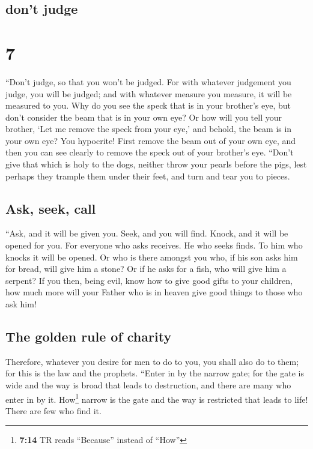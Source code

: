 \hypertarget{dont-judge}{%
\subsection{don't judge}\label{dont-judge}}

\hypertarget{section-6}{%
\section{7}\label{section-6}}

 ``Don't judge, so that you won't be judged.
 For with whatever judgement you judge, you will be
judged; and with whatever measure you measure, it will be measured to
you.  Why do you see the speck that is in your brother's
eye, but don't consider the beam that is in your own eye? 
Or how will you tell your brother, `Let me remove the speck from your
eye,' and behold, the beam is in your own eye?  You
hypocrite! First remove the beam out of your own eye, and then you can
see clearly to remove the speck out of your brother's eye.
 ``Don't give that which is holy to the dogs, neither
throw your pearls before the pigs, lest perhaps they trample them under
their feet, and turn and tear you to pieces.

\hypertarget{ask-seek-call}{%
\subsection{Ask, seek, call}\label{ask-seek-call}}

 ``Ask, and it will be given you. Seek, and you will find.
Knock, and it will be opened for you.  For everyone who
asks receives. He who seeks finds. To him who knocks it will be opened.
 Or who is there amongst you who, if his son asks him for
bread, will give him a stone?  Or if he asks for a fish,
who will give him a serpent?  If you then, being evil,
know how to give good gifts to your children, how much more will your
Father who is in heaven give good things to those who ask him!

\hypertarget{the-golden-rule-of-charity}{%
\subsection{The golden rule of
charity}\label{the-golden-rule-of-charity}}

 Therefore, whatever you desire for men to do to you, you
shall also do to them; for this is the law and the prophets.
 ``Enter in by the narrow gate; for the gate is wide and
the way is broad that leads to destruction, and there are many who enter
in by it.  How\footnote{\textbf{7:14} TR reads
  ``Because'' instead of ``How''} narrow is the gate and the way is
restricted that leads to life! There are few who find it.

